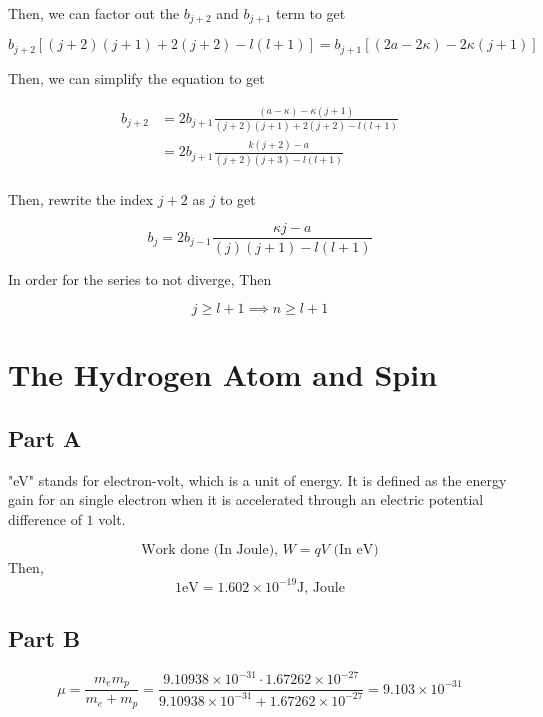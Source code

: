 \documentclass{article}
\begin{document}
Then, we can factor out the $b_{j+2}$ and $b_{j+1}$ term to get

\begin{equation}
  b_{j+2} \left[ (j+2) (j+1) + 2(j+2) - l(l+1) \right] = b_{j+1} [(2a-2\kappa) - 2\kappa (j+1)]
\end{equation}

Then, we can simplify the equation to get

\begin{align}
  b_{j+2} &= 2 b_{j+1} \frac{(a-\kappa) - \kappa (j+1)}{(j+2) (j+1) + 2(j+2) - l(l+1)} \\
  &= 2 b_{j+1} \frac{k(j+2) - a}{(j+2) (j+3) - l(l+1)} \\
\end{align}

Then, rewrite the index $j+2$ as $j$ to get

\begin{equation}
  b_{j} = 2 b_{j-1} \frac{\kappa j - a}{(j) (j+1) - l(l+1)}
\end{equation}

In order for the series to not diverge, Then

\begin{equation}
  j \geq l + 1 \implies n \geq l + 1
\end{equation}



\section{The Hydrogen Atom and Spin}
\subsection{Part A}
"eV" stands for electron-volt, which is a unit of energy. It is defined as the energy gain for an single electron
 when it is accelerated through an electric potential difference of $1$ volt.

\begin{equation}
  \text{Work done (In Joule), } W = qV \text{ (In eV)} 
\end{equation}
Then,
\begin{equation}
  1 \text{eV} = 1.602 \times 10^{-19} \text{J, Joule}
\end{equation}

\subsection{Part B}
\begin{equation}
  \mu = \frac{m_em_p}{m_e + m_p} = \frac{9.10938 \times 10^{-31} \cdot 1.67262 \times 10^{-27}}{9.10938 \times 10^{-31} + 1.67262 \times 10^{-27}} = 9.103 \times 10^{-31}
\end{equation}
\end{document}
